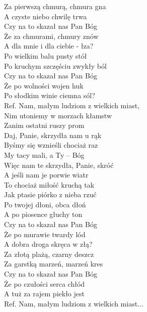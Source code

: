 
Za pierwszą chmurą, chmura gna    \\
A czyste niebo chwilę trwa  \tab{} \\
Czy na to skazał nas Pan Bóg   \tab{} \\
Że za chmurami, chmury znów \tab{}  \\
A dla mnie i dla ciebie - łza?  \tab{} \\
\hops
Po wielkim balu pusty stół   \\
Po kruchym szczęściu zwykły ból   \\
Czy na to skazał nas Pan Bóg     \\
Że po wolności wojen huk       \\
Po słodkim winie ciemna sól?      \\
\hops
Ref. Nam, małym ludziom z wielkich miast,  \\
 Nim utoniemy w morzach kłamstw    \\
 Zanim ostatni ruszy prom    \\
 Daj, Panie, skrzydła nam u rąk        \\
 Byśmy się wznieśli chociaż raz  \\
 My tacy mali, a Ty – Bóg \\
 Więc nam te skrzydła, Panie, skróć \\
 A jeśli nam je porwie wiatr \\
 To chociaż miłość kruchą tak \\
 Jak ptasie piórko z nieba rzuć \\
\hops
Po twojej dłoni, obca dłoń \\
A po piosence głuchy ton \\
Czy na to skazał nas Pan Bóg \\
Że po murawie twardy lód \\
A dobra droga skręca w złą? \\
\hops
Za złotą plażą, czarny deszcz \\
Za garstką marzeń, marzeń kres \\
Czy na to skazał nas Pan Bóg \\
Że po czułości serca chłód \\
A tuż za rajem piekło jest \\
\hops
Ref. Nam, małym ludziom z wielkich miast...